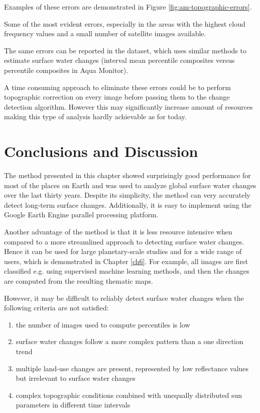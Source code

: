 Examples of these errors are demonstrated in Figure \ref{fig:am-topographic-errors}. 

Some of the most evident errors, especially in the areas with the highest cloud frequency values and a small number of satellite images available.

The same errors can be reported in the \citet{Hansen2013} dataset, which uses similar methods to estimate surface water changes (interval mean percentile composites versus percentile composites in Aqua Monitor).

A time consuming approach to eliminate these errors could be to perform topographic correction on every image before passing them to the change detection algorithm. However this may significantly increase amount of resources making this type of analysis hardly achievable as for today.


\section{Conclusions and Discussion}

The method presented in this chapter showed surprisingly good performance for most of the places on Earth and was used to analyze global surface water changes over the last thirty years. Despite its simplicity, the method can very accurately detect long-term surface changes. Additionally, it is easy to implement using the Google Earth Engine parallel processing platform.

Another advantage of the method is that it is less resource intensive when compared to a more streamlined approach to detecting surface water changes. Hence it can be used for large planetary-scale studies and for a wide range of users, which is demonstrated in Chapter \ref{ch6}. For example, all images are first classified e.g. using supervised machine learning methods, and then the changes are computed from the resulting thematic maps.

However, it may be difficult to reliably detect surface water changes when the following criteria are not satisfied:

\begin{enumerate}[label=(\alph*)]
	\item \label{enum:changes-low-count} the number of images used to compute percentiles is low
	\item \label{enum:changes-complex-trend} surface water changes follow a more complex pattern than a one direction trend
	\item \label{enum:changes-multple-classes} multiple land-use changes are present, represented by low reflectance values but irrelevant to surface water changes
	\item \label{enum:changes-topo} complex topographic conditions combined with unequally distributed sun parameters in different time intervals
\end{enumerate}

